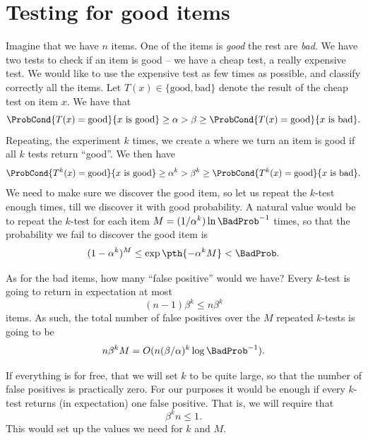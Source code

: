 \section{Testing for good items}

Imagine that we have $n$ items. One of the items is \emph{good} the
rest are \emph{bad}. We have two tests to check if an item is good --
we have a cheap test, a really expensive test. We would like to use
the expensive test as few times as possible, and classify correctly
all the items. Let $T(x) \in \{ \text{good}, \text{bad} \}$ denote the
result of the cheap test on item $x$. We have that
\begin{equation*}
    \ProbCond{T(x) = \text{good}}{x \text{ is good}}
    \geq \alpha >
    \beta \geq 
    \ProbCond{T(x) = \text{good}}{x \text{ is bad}}.    
\end{equation*}
Repeating, the experiment $k$ times, we create a 
where we turn an item is good if all $k$ tests return ``good''. We
then have
\begin{equation*}
    \ProbCond{T^k(x) = \text{good}}{x \text{ is good}}
    \geq \alpha^k >
    \beta^k \geq 
    \ProbCond{T^k(x) = \text{good}}{x \text{ is bad}}.    
\end{equation*}
We need to make sure we discover the good item, so let us repeat the
$k$-test enough times, till we discover it with good probability. A
natural value would be to repeat the $k$-test for each item
$M = (1/\alpha^k ) \ln \BadProb^{-1}$ times, so that the probability
we fail to discover the good item is
\begin{equation*}
    (1-\alpha^k)^{M} \leq
    \exp\pth{ -\alpha^k M }
    <
    \BadProb.
\end{equation*}

As for the bad items, how many ``false positive'' would we have? Every
$k$-test is going to return in expectation at most
\begin{equation*}
    (n-1)\beta^k \leq n \beta^k
\end{equation*}
items. As such, the total number of false positives over the $M$
repeated $k$-tests is going to be
\begin{equation*}
    n \beta^k M = O(n (\beta/\alpha)^k \log \BadProb^{-1}).
\end{equation*}

If everything is for free, that we will set $k$ to be quite large, so
that the number of false positives is practically zero. For our
purposes it would be enough if every $k$-test returns (in expectation)
one false positive. That is, we will require that
\begin{equation*}
    \beta^k n \leq 1.
\end{equation*}
This would set up the values we need for $k$ and $M$. 





